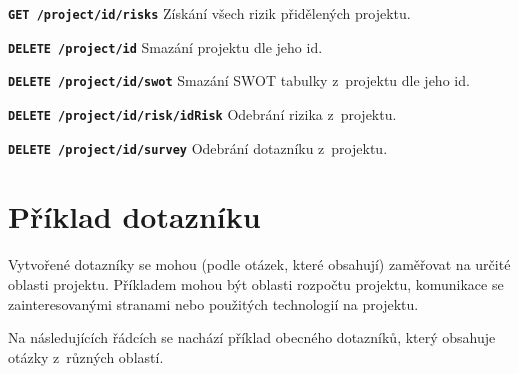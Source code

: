 \begin{DESCRIPTION}
\item \texttt{\textbf{GET /project/{id}/risks}} Získání všech rizik přidělených projektu.
\item \texttt{\textbf{DELETE /project/{id}}} Smazání projektu dle jeho id.
\item \texttt{\textbf{DELETE /project/{id}/swot}} Smazání SWOT tabulky z~projektu dle jeho id.
\item \texttt{\textbf{DELETE /project/{id}/risk/{idRisk}}} Odebrání rizika z~projektu.
\item \texttt{\textbf{DELETE /project/{id}/survey}} Odebrání dotazníku z~projektu.
\end{DESCRIPTION}

\chapter{Příklad dotazníku}
\label{prikladDotazniku}

Vytvořené dotazníky se mohou (podle otázek, které obsahují) zaměřovat na určité oblasti projektu. Příkladem mohou být oblasti rozpočtu projektu, komunikace se zainteresovanými stranami nebo použitých technologií na projektu.

Na následujících řádcích se nachází příklad obecného dotazníků, který obsahuje otázky z~různých oblastí.


